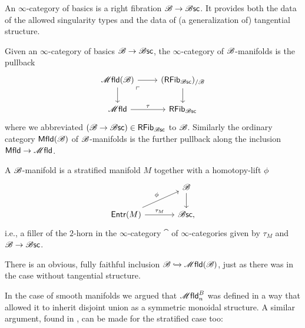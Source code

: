 \documentclass[../text]{subfiles}
\begin{document}
\begin{definition}
    An $\infty$-category of basics is a right fibration $\mathscr{B} \rightarrow \mathscr{B} \mathsf{sc}$. It provides both the data of the allowed singularity types and the data of (a generalization of) tangential structure.
\end{definition}

\begin{definition}
    Given an $\infty$-category of basics $\mathscr{B} \rightarrow \mathscr{B} \mathsf{sc}$, the $\infty$-category of $\mathscr{B}$-manifolds is the pullback
    \begin{equation}
        \begin{tikzcd}
            \mfld(\bstr) \arrow[dr, phantom, "\ulcorner", very near start] \arrow[r] \arrow[d] & (\mathsf{RFib}_{\bsc})_{/\bstr} \arrow[d] \\
            \mfld \arrow[r, "\tau"] & \mathsf{RFib}_{\bsc}
        \end{tikzcd}
    \end{equation}
    where we abbreviated $(\mathscr{B}\to\mathscr{B} \mathsf{sc})\in\mathsf{RFib}_{\mathscr{B} \mathsf{sc}}$ to $\mathscr{B}$. Similarly the ordinary category $\mfld[r](\bstr)$ of $\mathscr{B}$-manifolds is the further pullback along the inclusion $\mfld[r]\to\mfld$.
\end{definition}

\begin{remark}
    A $\mathscr{B}$-manifold is a stratified manifold $M$ together with a homotopy-lift $\phi$
    \begin{equation}
        \begin{tikzcd}[column sep = large]
            & \bstr \arrow[d] \\
            \mathsf{Entr}(M) \arrow[ru, "\phi"] \arrow[r, "\tau_M"] & \bsc,
        \end{tikzcd}
    \end{equation}
    i.e., a filler of the $2$-horn in the $\infty$-category $\cat$ of $\infty$-categories  given by $\tau_M$ and $\mathscr{B}\to\mathscr{B} \mathsf{sc}$.
\end{remark}

\begin{remark}
    There is an obvious, fully faithful inclusion $\bstr \xhookrightarrow{} \mfld(\bstr)$, just as there was in the case without tangential structure.
\end{remark}

In the case of smooth manifolds we argued that $\mfld_n^B$ was defined in a way that allowed it to inherit disjoint union as a symmetric monoidal structure. A similar argument, found in \cite{aft_fhstrat}, can be made for the stratified case too: 
\end{document}
